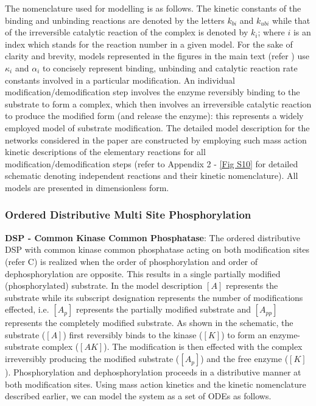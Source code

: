 \documentclass[9pt,lineno]{elife}
\begin{document}
\begin{appendixbox}
The nomenclature used for modelling is as follows. The kinetic constants of the binding and unbinding reactions are denoted by the letters $k_{bi}$ and $k_{ubi}$ while that of the irreversible catalytic reaction of the complex is denoted by $k_i$; where $i$  is an index which stands for the reaction number in a given model. For the sake of clarity and brevity, models represented in the figures in the main text (refer ) use $\kappa_i$ and $\alpha_i$ to concisely represent binding, unbinding and catalytic reaction rate constants involved in a particular modification.
An individual modification/demodification step involves the enzyme reversibly binding to the substrate to form a complex, which then involves an irreversible catalytic reaction to produce the modified form (and release the enzyme): this represents a widely employed model of substrate modification.
The detailed model description for the networks considered in the paper are constructed by employing such mass action kinetic descriptions of the elementary reactions for all modification/demodification steps (refer to Appendix 2 - \cref{Fig S10} for detailed schematic denoting independent reactions and their kinetic nomenclature). All models are presented in dimensionless form.

\subsubsection*{Ordered Distributive Multi Site Phosphorylation}

\textbf{DSP - Common Kinase Common Phosphatase}: The ordered distributive DSP with common kinase common phosphatase acting on both modification sites (refer C) is realized when the order of phosphorylation and order of dephosphorylation are opposite. This results in a single partially modified (phosphorylated) substrate. In the model description $[A]$ represents the substrate while its subscript designation represents the number of modifications effected, i.e. $[A_p]$ represents the partially modified substrate and $[A_{pp}]$ represents the completely modified substrate. As shown in the schematic, the substrate ($[A]$) first reversibly binds to the kinase ($[K]$) to form an enzyme-substrate complex ($[AK]$). The modification is then effected with the complex irreversibly producing the modified substrate ($[A_p]$) and the free enzyme ($[K]$). Phosphorylation and dephosphorylation proceeds in a distributive manner at both modification sites. Using mass action kinetics and the kinetic nomenclature described earlier, we can model the system as a set of ODEs as follows. 


\end{appendixbox}
\end{document}
